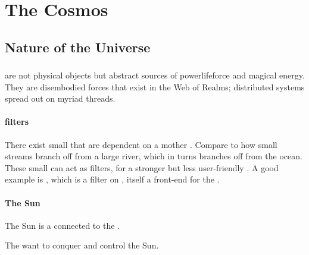 
\part{The Cosmos}
\chapter{Nature of the Universe}
\section{\Dweomers}
\Dweomers{} are not physical objects but abstract sources of power\dash lifeforce and magical energy. 
They are disembodied forces that exist in the Web of Realms; distributed systems spread out on myriad threads. 








\subsection{\Dweomer{} filters}
There exist small \dweomers{} that are dependent on a mother \dweomer. 
Compare to how small streams branch off from a large river, which in turns branches off from the ocean. 
These small \dweomers{} can act as filters,  for a stronger but less user-friendly \dweomer. 
A good example is \iquin, which is a filter on \itzach, itself a front-end for the . 









\subsection{The Sun}
The Sun is a \dweomer{} connected to the . 

The \banes{} want to conquer and control the Sun. 











